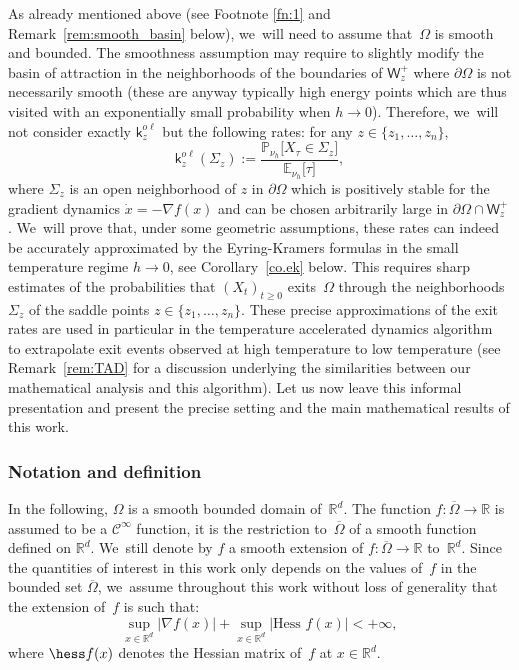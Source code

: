 As already mentioned above (see Footnote \eqref{fn:1} and
Remark~\ref{rem:smooth_basin} below), we~will need to assume that~$\Omega$ is
smooth and bounded. The smoothness assumption may require to slightly modify the basin of
attraction in the neighborhoods of the boundaries of $\mathsf W_z^+$ where
$\partial \Omega$ is not necessarily smooth (these are anyway typically high
energy points which are thus visited with an exponentially small
probability when \hbox{$h \to 0$}). Therefore, we~will
not consider exactly $\mathsf k_{z}^{o\ell}$ but the
following rates: for any $z \in \{z_1, \ldots, z_n\}$,
\begin{equation}\label{kijl}
\mathsf k_{z}^{o\ell}(\Sigma_{z}):=\frac{\mathbb P_{\nu_{h}}\big [
X_{\tau} \in \Sigma_{z} \big]}{\mathbb E_{\nu_{h}}\big [ \tau \big]},
\end{equation}
where $\Sigma_{z}$ is an open neighborhood of $z$ in $\partial
\Omega$ which is positively stable for the gradient dynamics $\dot{x}
= -\nabla f(x)$ and can be chosen arbitrarily large in $ \partial \Omega \cap \mathsf W_z^+$. We~will prove that, under
some geometric assumptions, these rates can indeed be accurately approximated by
the Eyring-Kramers formulas in the small temperature regime $h \to 0$, see Corollary~\ref{co.ek} below. This requires sharp estimates of the
probabilities that $(X_t)_{t \ge 0}$ exits~$\Omega$ through the
neighborhoods $\Sigma_z$
of the saddle points $z \in \{z_1, \ldots, z_n\}$. These
precise approximations of the exit rates are used in particular in the
temperature accelerated dynamics algorithm~\cite{sorensen-voter-00} to extrapolate exit events
observed at high temperature to low temperature
(see Remark~\ref{rem:TAD} for a discussion underlying the similarities between our mathematical
analysis and this algorithm). Let us now
leave this informal presentation and present the precise setting and
the main mathematical results of this work.


\subsubsection{Notation and definition}

In the following, $\Omega$ is a smooth bounded domain of~$\mathbb R^d$. The function $f:\overline \Omega\to \mathbb
R$ is assumed to be a $\mathcal C^\infty$ function, \ie it is the restriction
to~$\overline \Omega$ of a smooth function defined on $\mathbb R^d$. We~still
denote by $f$ a smooth extension of $f:\overline \Omega\to \mathbb
R$ to~$\mathbb R^d$. Since the quantities of interest in this work
only depends on the values of~$f$ in the bounded set
$\overline{\Omega}$, we~assume throughout this work without loss of
generality that the extension of~$f$ is such that:
\begin{equation}\label{eq.DB}
\sup_{x\in \mathbb R^d} |\nabla f(x)|+ \sup_{x\in \mathbb R^d} |\text{Hess } f(x)|<+\infty,
\end{equation}
where $\hess f(x)$ denotes the Hessian matrix of~$f$ at $x\in \mathbb R^d$.

